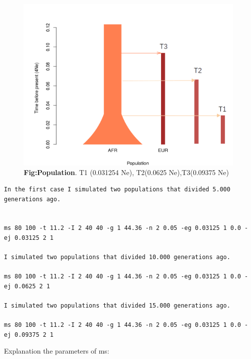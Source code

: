 



\begin{figure}[H]
\centering
\includegraphics[width=1.10\textwidth]{fig/populationthreetime.png}
\decoRule
\caption{\textbf{Fig:Population}. 
T1 (0.031254 Ne), T2(0.0625 Ne),T3(0.09375 Ne)}
\label{fig:population.pdf}
\end{figure}

\begin{verbatim}
In the first case I simulated two populations that divided 5.000 generations ago.


ms 80 100 -t 11.2 -I 2 40 40 -g 1 44.36 -n 2 0.05 -eg 0.03125 1 0.0 -ej 0.03125 2 1   

I simulated two populations that divided 10.000 generations ago.

ms 80 100 -t 11.2 -I 2 40 40 -g 1 44.36 -n 2 0.05 -eg 0.03125 1 0.0 -ej 0.0625 2 1   

I simulated two populations that divided 15.000 generations ago.

ms 80 100 -t 11.2 -I 2 40 40 -g 1 44.36 -n 2 0.05 -eg 0.03125 1 0.0 -ej 0.09375 2 1   
\end{verbatim}

Explanation the parameters of ms:

